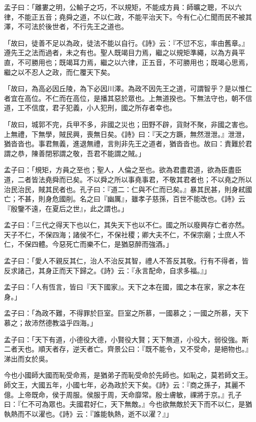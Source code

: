 
\begin{pinyinscope}
孟子曰：「離婁之明，公輸子之巧，不以規矩，不能成方員：師曠之聰，不以六律，不能正五音；堯舜之道，不以仁政，不能平治天下。今有仁心仁聞而民不被其澤，不可法於後世者，不行先王之道也。

「故曰，徒善不足以為政，徒法不能以自行。《詩》云：『不愆不忘，率由舊章。』遵先王之法而過者，未之有也。聖人既竭目力焉，繼之以規矩準繩，以為方員平直，不可勝用也；既竭耳力焉，繼之以六律，正五音，不可勝用也；既竭心思焉，繼之以不忍人之政，而仁覆天下矣。

「故曰，為高必因丘陵，為下必因川澤。為政不因先王之道，可謂智乎？是以惟仁者宜在高位。不仁而在高位，是播其惡於眾也。上無道揆也。下無法守也，朝不信道，工不信度，君子犯義，小人犯刑，國之所存者幸也。

「故曰，城郭不完，兵甲不多，非國之災也；田野不辟，貨財不聚，非國之害也。上無禮，下無學，賊民興，喪無日矣。《詩》曰：『天之方蹶，無然泄泄。』泄泄，猶沓沓也。事君無義，進退無禮，言則非先王之道者，猶沓沓也。故曰：責難於君謂之恭，陳善閉邪謂之敬，吾君不能謂之賊。」

孟子曰：「規矩，方員之至也；聖人，人倫之至也。欲為君盡君道，欲為臣盡臣道，二者皆法堯舜而已矣。不以舜之所以事堯事君，不敬其君者也；不以堯之所以治民治民，賊其民者也。孔子曰：『道二：仁與不仁而已矣。』暴其民甚，則身弒國亡；不甚，則身危國削。名之曰『幽厲』，雖孝子慈孫，百世不能改也。《詩》云『殷鑒不遠，在夏后之世』，此之謂也。」

孟子曰：「三代之得天下也以仁，其失天下也以不仁。國之所以廢興存亡者亦然。天子不仁，不保四海；諸侯不仁，不保社稷；卿大夫不仁，不保宗廟；士庶人不仁，不保四體。今惡死亡而樂不仁，是猶惡醉而強酒。」

孟子曰：「愛人不親反其仁，治人不治反其智，禮人不答反其敬。行有不得者，皆反求諸己，其身正而天下歸之。《詩》云：『永言配命，自求多福。』」

孟子曰：「人有恆言，皆曰『天下國家』。天下之本在國，國之本在家，家之本在身。」

孟子曰：「為政不難，不得罪於巨室。巨室之所慕，一國慕之；一國之所慕，天下慕之；故沛然德教溢乎四海。」

孟子曰：「天下有道，小德役大德，小賢役大賢；天下無道，小役大，弱役強。斯二者天也。順天者存，逆天者亡。齊景公曰：『既不能令，又不受命，是絕物也。』涕出而女於吳。

今也小國師大國而恥受命焉，是猶弟子而恥受命於先師也。如恥之，莫若師文王。師文王，大國五年，小國七年，必為政於天下矣。《詩》云：『商之孫子，其麗不億。上帝既命，侯于周服。侯服于周，天命靡常。殷士膚敏，祼將于京。』孔子曰：『仁不可為眾也。夫國君好仁，天下無敵。』今也欲無敵於天下而不以仁，是猶執熱而不以濯也。《詩》云：『誰能執熱，逝不以濯？』」


\end{pinyinscope}
